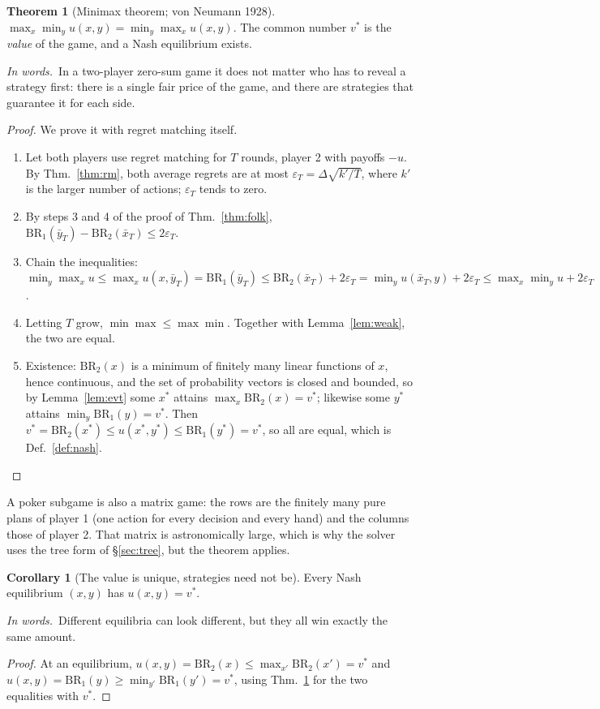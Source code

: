 \documentclass[11pt]{article}
\theoremstyle{definition}
\newtheorem{theorem}[definition]{Theorem}
\newtheorem{corollary}[definition]{Corollary}
\newcommand{\inwords}{\par\smallskip\noindent\textit{In words.}\ }
\newcommand{\Def}[1]{Def.~\ref{#1}}\newcommand{\Lem}[1]{Lemma~\ref{#1}}\newcommand{\Thm}[1]{Thm.~\ref{#1}}
\begin{document}
\begin{theorem}[Minimax theorem; von Neumann 1928]\label{thm:minimax}
$\max_x\min_yu(x,y)=\min_y\max_xu(x,y)$. The common number $v^\ast$ is the \emph{value} of the game, and a Nash equilibrium
exists.
\inwords In a two-player zero-sum game it does not matter who has to reveal a strategy first: there is a single fair
price of the game, and there are strategies that guarantee it for each side.
\end{theorem}
\begin{proof}
We prove it with regret matching itself.
\begin{enumerate}[nosep]
\item Let both players use regret matching for $T$ rounds, player 2 with payoffs $-u$. By \Thm{thm:rm}, both average
regrets are at most $\varepsilon_T=\Delta\sqrt{k'/T}$, where $k'$ is the larger number of actions; $\varepsilon_T$ tends to zero.
\item By steps 3 and 4 of the proof of \Thm{thm:folk}, $\mathrm{BR}_1(\bar y_T)-\mathrm{BR}_2(\bar x_T)\le2\varepsilon_T$.
\item Chain the inequalities:
$\min_y\max_xu\le\max_xu(x,\bar y_T)=\mathrm{BR}_1(\bar y_T)\le\mathrm{BR}_2(\bar x_T)+2\varepsilon_T=\min_yu(\bar x_T,y)+2\varepsilon_T\le\max_x\min_yu+2\varepsilon_T$.
\item Letting $T$ grow, $\min\max\le\max\min$. Together with \Lem{lem:weak}, the two are equal.
\item Existence: $\mathrm{BR}_2(x)$ is a minimum of finitely many linear functions of $x$, hence continuous, and the set of
probability vectors is closed and bounded, so by \Lem{lem:evt} some $x^\ast$ attains $\max_x\mathrm{BR}_2(x)=v^\ast$; likewise
some $y^\ast$ attains $\min_y\mathrm{BR}_1(y)=v^\ast$. Then $v^\ast=\mathrm{BR}_2(x^\ast)\le u(x^\ast,y^\ast)\le\mathrm{BR}_1(y^\ast)=v^\ast$, so all are
equal, which is \Def{def:nash}.\qedhere
\end{enumerate}
\end{proof}
A poker subgame is also a matrix game: the rows are the finitely many pure plans of player 1 (one action for every
decision and every hand) and the columns those of player 2. That matrix is astronomically large, which is why the solver
uses the tree form of \S\ref{sec:tree}, but the theorem applies.

\begin{corollary}[The value is unique, strategies need not be]\label{cor:value}
Every Nash equilibrium $(x,y)$ has $u(x,y)=v^\ast$.
\inwords Different equilibria can look different, but they all win exactly the same amount.
\end{corollary}
\begin{proof}
At an equilibrium, $u(x,y)=\mathrm{BR}_2(x)\le\max_{x'}\mathrm{BR}_2(x')=v^\ast$ and $u(x,y)=\mathrm{BR}_1(y)\ge\min_{y'}\mathrm{BR}_1(y')=v^\ast$, using
\Thm{thm:minimax} for the two equalities with $v^\ast$.
\end{proof}
\end{document}
